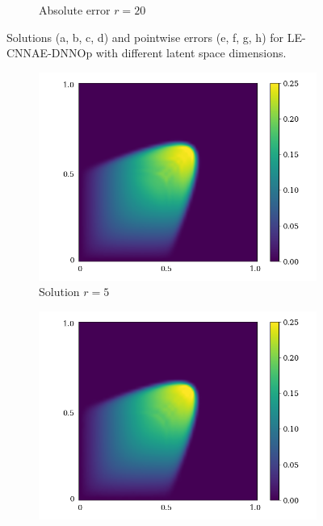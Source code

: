\begin{figure}[!htb]
\begin{center}
\begin{subfigure}[b]{0.23\textwidth}
\begin{center}
             \end{center}
             \caption{Absolute error $r = 20$}
         \end{subfigure}
     \end{center}
     \caption[Solutions and pointwise errors for LE-CNNAE-DNNOp.]{Solutions (a, b, c, d) and pointwise errors (e, f, g, h) for LE-CNNAE-DNNOp with different latent space dimensions.}
        \label{fig: lecnnae-burger}
\end{figure}

\begin{figure}[!htb]
     \begin{center}
        \begin{subfigure}[b]{0.23\textwidth}
       \begin{center}
        \includegraphics[trim = {0, 0, 3cm, 0}, clip, width=\textwidth]{Pictures/X-rom-NE-DAE-5.png}
       \end{center}
            \caption{Solution $r = 5$}
        \end{subfigure}
   \begin{subfigure}[b]{0.23\textwidth}
        \begin{center}
            \includegraphics[trim = {0, 0, 3cm, 0}, clip, width=\textwidth]{Pictures/X-rom-NE-DAE-10.png}

\end{center}
\end{subfigure}
\end{center}
\end{figure}
